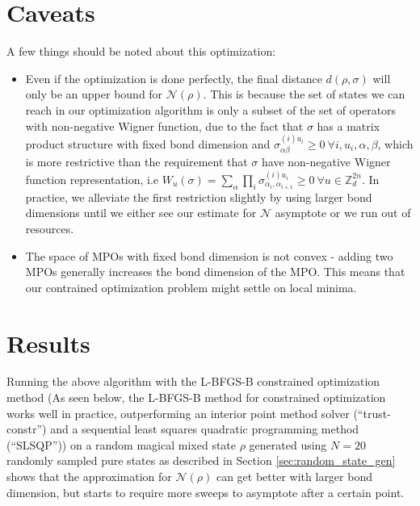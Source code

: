 \documentclass{article}
\begin{document}
\section{Caveats}

A few things should be noted about this optimization:

\begin{itemize}
	\item Even if the optimization is done perfectly, the final distance $d(\rho,\sigma)$ will only be an upper bound for $\mathcal N(\rho)$. This is because the set of states we can reach in our optimization algorithm is only a subset of the set of operators with non-negative Wigner function, due to the fact that $\sigma$ has a matrix product structure with fixed bond dimension and $\sigma^{(i)u_i}_{\alpha\beta}\geq 0\ \forall i,u_i,\alpha,\beta$, which is more restrictive than the requirement that $\sigma$ have non-negative Wigner function representation, i.e $W_u(\sigma)=\sum_\alpha \prod_i \sigma^{(i)u_i}_{\alpha_i,\alpha_{i+1}}\geq 0\ \forall u\in \mathbb Z_d^{2n}$. In practice, we alleviate the first restriction slightly by using larger bond dimensions until we either see our estimate for $\mathcal N$ asymptote or we run out of resources.
	\item The space of MPOs with fixed bond dimension is not convex - adding two MPOs generally increases the bond dimension of the MPO. This means that our contrained optimization problem might settle on local minima. 
\end{itemize}

\pagebreak

\section{Results}

Running the above algorithm with the L-BFGS-B constrained optimization method (As seen below, the L-BFGS-B method \cite{bfgs,bfgs_large_scale} for constrained optimization works well in practice, outperforming an interior point method solver (``trust-constr'') and a sequential least squares quadratic programming method (``SLSQP'')) on a random magical mixed state $\rho$ generated using $N=20$ randomly sampled pure states as described in Section \ref{sec:random_state_gen} shows that the approximation for $\mathcal N(\rho)$ can get better with larger bond dimension, but starts to require more sweeps to asymptote after a certain point.
\end{document}
